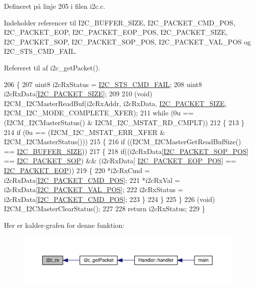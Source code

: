 Defineret på linje 205 i filen i2c.\+c.



Indeholder referencer til I2\+C\+\_\+\+B\+U\+F\+F\+E\+R\+\_\+\+S\+I\+ZE, I2\+C\+\_\+\+P\+A\+C\+K\+E\+T\+\_\+\+C\+M\+D\+\_\+\+P\+OS, I2\+C\+\_\+\+P\+A\+C\+K\+E\+T\+\_\+\+E\+OP, I2\+C\+\_\+\+P\+A\+C\+K\+E\+T\+\_\+\+E\+O\+P\+\_\+\+P\+OS, I2\+C\+\_\+\+P\+A\+C\+K\+E\+T\+\_\+\+S\+I\+ZE, I2\+C\+\_\+\+P\+A\+C\+K\+E\+T\+\_\+\+S\+OP, I2\+C\+\_\+\+P\+A\+C\+K\+E\+T\+\_\+\+S\+O\+P\+\_\+\+P\+OS, I2\+C\+\_\+\+P\+A\+C\+K\+E\+T\+\_\+\+V\+A\+L\+\_\+\+P\+OS og I2\+C\+\_\+\+S\+T\+S\+\_\+\+C\+M\+D\+\_\+\+F\+A\+IL.



Refereret til af i2c\+\_\+get\+Packet().


\begin{DoxyCode}
206 \{
207   uint8 i2cRxStatus = \hyperlink{i2c_8h_aee0adbd7dcb13e95337369b7342a27e3}{I2C\_STS\_CMD\_FAIL};
208   uint8 i2cRxData[\hyperlink{i2c_8h_a8c24abf58121f3c16b5f687cc2946cd1}{I2C\_PACKET\_SIZE}];
209   
210   (void) I2CM\_I2CMasterReadBuf(i2cRxAddr, i2cRxData, \hyperlink{i2c_8h_a8c24abf58121f3c16b5f687cc2946cd1}{I2C\_PACKET\_SIZE}, 
      I2CM\_I2C\_MODE\_COMPLETE\_XFER);
211   \textcolor{keywordflow}{while} (0u == (I2CM\_I2CMasterStatus() & I2CM\_I2C\_MSTAT\_RD\_CMPLT))
212   \{
213   \}
214   \textcolor{keywordflow}{if} (0u == (I2CM\_I2C\_MSTAT\_ERR\_XFER & I2CM\_I2CMasterStatus()))
215   \{
216     \textcolor{keywordflow}{if} ((I2CM\_I2CMasterGetReadBufSize() == \hyperlink{i2c_8h_a6458dbf193a0eef0470fc1b08400bfcd}{I2C\_BUFFER\_SIZE}))
217     \{
218       \textcolor{keywordflow}{if}((i2cRxData[\hyperlink{i2c_8h_a1207f4b2c3692b1a344f0013da629310}{I2C\_PACKET\_SOP\_POS}] == \hyperlink{i2c_8h_a52bb5b964361ed2f1b18df32c5b8f2c5}{I2C\_PACKET\_SOP}) && (i2cRxData[
      \hyperlink{i2c_8h_a940f0ea8103872c7ba81b9dc0f121feb}{I2C\_PACKET\_EOP\_POS}] == \hyperlink{i2c_8h_a62b4ae6e51a3d0da47f5165165cdbc0a}{I2C\_PACKET\_EOP}))
219       \{
220         *i2cRxCmd = i2cRxData[\hyperlink{i2c_8h_ac13fcfeded7dc2d82fa4734456f3761f}{I2C\_PACKET\_CMD\_POS}];
221         *i2cRxVal = i2cRxData[\hyperlink{i2c_8h_a68506c3651f015716bb2c135e8e7b972}{I2C\_PACKET\_VAL\_POS}];
222         i2cRxStatus = i2cRxData[\hyperlink{i2c_8h_ac13fcfeded7dc2d82fa4734456f3761f}{I2C\_PACKET\_CMD\_POS}];
223       \}
224     \}
225   \}
226   (void) I2CM\_I2CMasterClearStatus();
227   
228   \textcolor{keywordflow}{return} i2cRxStatus;
229 \}
\end{DoxyCode}


Her er kalder-\/grafen for denne funktion\+:
\nopagebreak
\begin{figure}[H]
\begin{center}
\leavevmode
\includegraphics[width=350pt]{d4/d47/class_i2_c_a802cdc1702988bf2e8efaba23eb0ce1b_icgraph}
\end{center}
\end{figure}


